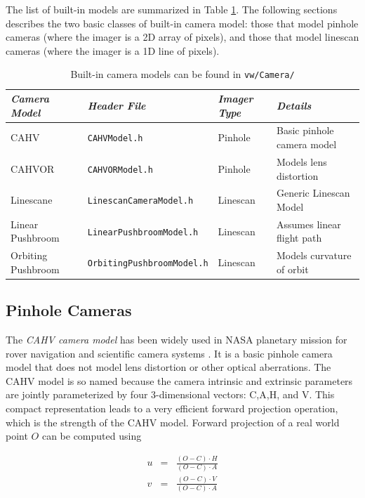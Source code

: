 The list of built-in models are summarized in Table
\ref{tab:camera-models}.  The following sections describes the two
basic classes of built-in camera model: those that model pinhole
cameras (where the imager is a 2D array of pixels), and those that
model linescan cameras (where the imager is a 1D line of pixels).

\begin{table}[tdp]
\begin{center}
\begin{tabular}{|l|l|l|l|}
\hline
{\em Camera Model} & {\em Header File} & {\em Imager Type} & {\em Details}\\
\hline CAHV         & {\tt CAHVModel.h} & Pinhole     & Basic pinhole camera model \\
CAHVOR       & {\tt CAHVORModel.h} & Pinhole     & Models lens distortion\\
Linescane     & {\tt LinescanCameraModel.h} & Linescan & Generic Linescan Model \\
Linear Pushbroom    & {\tt LinearPushbroomModel.h} & Linescan & Assumes linear flight path \\
Orbiting Pushbroom & {\tt OrbitingPushbroomModel.h} & Linescan & Models curvature of orbit \\
\hline
\end{tabular}
\end{center}
\label{tab:camera-models}
\caption{Built-in camera models can be found in {\tt vw/Camera/} }
\end{table}

\subsection{Pinhole Cameras}

The {\em CAHV camera model} has been widely used in NASA planetary
mission for rover navigation and scientific camera systems
\cite{yakimovsky78}.  It is a basic pinhole camera model that does not
model lens distortion or other optical aberrations.  The CAHV model is
so named because the camera intrinsic and extrinsic parameters are
jointly parameterized by four 3-dimensional vectors: C,A,H, and V.
This compact representation leads to a very efficient forward
projection operation, which is the strength of the CAHV model.
Forward projection of a real world point $O$ can be computed using

\begin{eqnarray}
u & = & \frac{(O-C) \cdot H}{(O-C) \cdot A}\\
v & = & \frac{(O-C) \cdot V}{(O-C) \cdot A}
\end{eqnarray}

